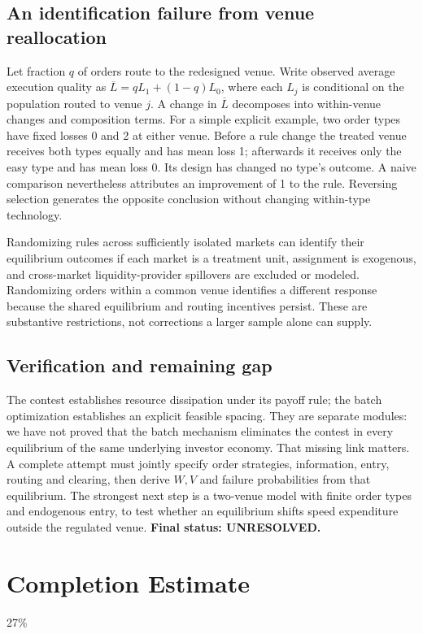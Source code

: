 \documentclass[11pt]{article}
\begin{document}
\subsection*{An identification failure from venue reallocation}
Let fraction $q$ of orders route to the redesigned venue. Write observed
average execution quality as
$\overline L=qL_1+(1-q)L_0$, where each $L_j$ is conditional on the
population routed to venue $j$. A change in $\overline L$ decomposes into
within-venue changes and composition terms. For a simple explicit example,
two order types have fixed losses 0 and 2 at either venue. Before a rule
change the treated venue receives both types equally and has mean loss 1;
afterwards it receives only the easy type and has mean loss 0. Its design
has changed no type's outcome. A naive comparison nevertheless attributes
an improvement of 1 to the rule. Reversing selection generates the opposite
conclusion without changing within-type technology.

Randomizing rules across sufficiently isolated markets can identify their
equilibrium outcomes if each market is a treatment unit, assignment is
exogenous, and cross-market liquidity-provider spillovers are excluded or
modeled. Randomizing orders within a common venue identifies a different
response because the shared equilibrium and routing incentives persist.
These are substantive restrictions, not corrections a larger sample alone
can supply.

\subsection*{Verification and remaining gap}
The contest establishes resource dissipation under its payoff rule; the
batch optimization establishes an explicit feasible spacing. They are
separate modules: we have not proved that the batch mechanism eliminates
the contest in every equilibrium of the same underlying investor economy.
That missing link matters. A complete attempt must jointly specify order
strategies, information, entry, routing and clearing, then derive $W,V$
and failure probabilities from that equilibrium. The strongest next step
is a two-venue model with finite order types and endogenous entry, to test
whether an equilibrium shifts speed expenditure outside the regulated
venue. \textbf{Final status: UNRESOLVED.}

\section{Completion Estimate}
27\%
\end{document}
